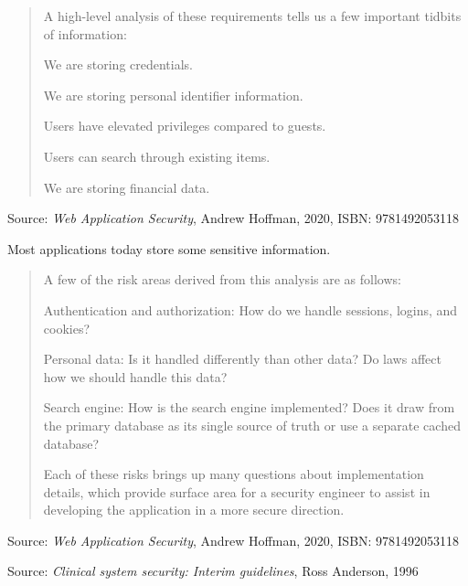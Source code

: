 \documentclass[Screen16to9,17pt]{foils}
\begin{document}

\begin{quote}
A high-level analysis of these requirements tells us a few important tidbits of
information:
\begin{list2}
\item We are storing credentials.
\item We are storing personal identifier information.
\item Users have elevated privileges compared to guests.
\item Users can search through existing items.
\item We are storing financial data.
\end{list2}
\end{quote}

Source: \emph{Web Application Security}, Andrew Hoffman, 2020, ISBN: 9781492053118


Most applications today store some sensitive information.



\begin{quote}
A few of the risk areas derived from this analysis are as follows:
\begin{list2}
\item Authentication and authorization: How do we handle sessions, logins, and
cookies?
\item Personal data: Is it handled differently than other data? Do laws affect how we
should handle this data?
\item Search engine: How is the search engine implemented? Does it draw from the
primary database as its single source of truth or use a separate cached database?
\end{list2}

Each of these risks brings up many questions about implementation details, which provide surface area for a security engineer to assist in developing the application in a more secure direction.
\end{quote}
Source: \emph{Web Application Security}, Andrew Hoffman, 2020, ISBN: 9781492053118





Source:
\emph{Clinical system security: Interim guidelines}, Ross Anderson, 1996
\end{document}
